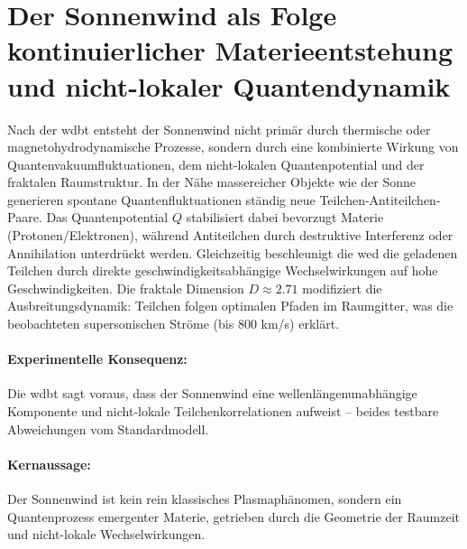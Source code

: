 \section{Der Sonnenwind als Folge kontinuierlicher Materieentstehung und nicht-lokaler Quantendynamik}
Nach der \gls{wdbt} entsteht der Sonnenwind nicht primär durch thermische oder magnetohydrodynamische Prozesse, sondern durch eine kombinierte Wirkung von Quantenvakuumfluktuationen, dem nicht-lokalen
Quantenpotential und der fraktalen Raumstruktur. In der Nähe massereicher Objekte wie der Sonne generieren spontane Quantenfluktuationen ständig neue Teilchen-Antiteilchen-Paare. Das Quantenpotential
$Q$ stabilisiert dabei bevorzugt Materie (Protonen/Elektronen), während Antiteilchen durch destruktive Interferenz oder Annihilation unterdrückt werden. Gleichzeitig beschleunigt die \gls{wed} die
geladenen Teilchen durch direkte geschwindigkeitsabhängige Wechselwirkungen auf hohe Geschwindigkeiten. Die fraktale Dimension $D \approx 2.71$ modifiziert die Ausbreitungsdynamik: Teilchen folgen
optimalen Pfaden im Raumgitter, was die beobachteten supersonischen Ströme (bis 800 km/s) erklärt.

\paragraph{Experimentelle Konsequenz:} Die \gls{wdbt} sagt voraus, dass der Sonnenwind eine wellenlängenunabhängige Komponente und nicht-lokale Teilchenkorrelationen aufweist – beides testbare
Abweichungen vom Standardmodell.

\paragraph{Kernaussage:} Der Sonnenwind ist kein rein klassisches Plasmaphänomen, sondern ein Quantenprozess emergenter Materie, getrieben durch die Geometrie der Raumzeit und nicht-lokale Wechselwirkungen.
